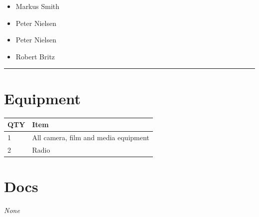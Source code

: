 \documentclass[10pt]{article}
\begin{document}
	\begin{multicols}{2}

		\begin{itemize}
									\item Markus Smith
									\item Peter Nielsen
						\end{itemize}

		\vfill\null
		\columnbreak

		\begin{itemize}
									\item Peter Nielsen
									\item Robert Britz
						\end{itemize}

		\vfill\null

		\end{multicols}



			\vspace{0.5cm}
	\hrule
	\vspace{0.5cm}

	\begin{multicols}{2}

		\section*{\faWrench \: Equipment}

		
	\begin{center}
			\begin{tabular}{p{2cm}p{4cm}}


				\textbf{QTY} & \textbf{Item} \\\toprule
												1&All camera, film and media equipment\\\midrule
												2&Radio\\\midrule
								\end{tabular}

			\end{center}

		
		\vfill\null
		\columnbreak

			\section*{\faFile \: Docs}
		 	\textit{None}
	

		\vfill\null

		\end{multicols}
\end{document}

